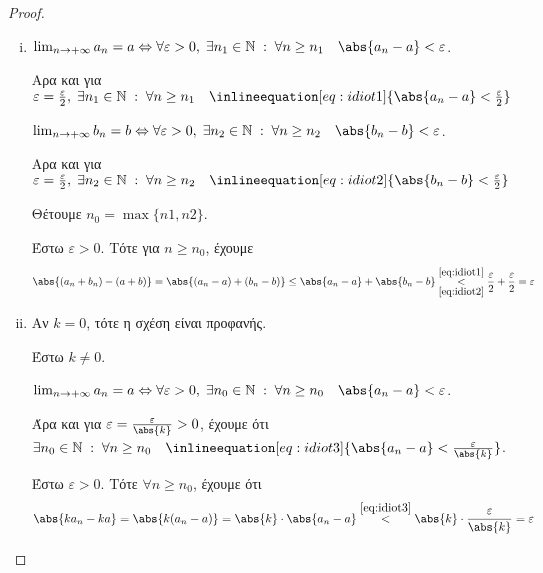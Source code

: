 \documentclass[main.tex]{subfiles}
\begin{document}
\begin{proof}
\item {}
    \begin{enumerate}[i)]
        \item $ \lim_{n \to +\infty} a_{n} = a \Leftrightarrow \forall \varepsilon > 0, \; 
            \exists n_{1} \in \mathbb{N} \; : \; \forall n \geq n_{1} \quad \abs{a_{n}-a} <
            \varepsilon$.

            Αρα και για $ \varepsilon = \frac{\varepsilon}{ 2}, \; \exists n_{1} \in \mathbb{N} 
            \; : \; \forall n \geq n_{1} \quad \inlineequation[eq:idiot1]{\abs{a_{n}-a} <
            \frac{\varepsilon}{ 2}} $

            $ \lim_{n \to +\infty} b_{n} = b \Leftrightarrow \forall \varepsilon > 0, \; 
            \exists n_{2} \in \mathbb{N} \; : \; \forall n \geq n_{2} \quad \abs{b_{n}-b} <
            \varepsilon$.

            Αρα και για $ \varepsilon = \frac{\varepsilon}{ 2}, \; \exists n_{2} \in \mathbb{N} 
            \; : \; \forall n \geq n_{2} \quad \inlineequation[eq:idiot2]{\abs{b_{n}-b} <
            \frac{\varepsilon}{ 2}} $

            Θέτουμε $ n_{0}= \max \{ n1,n2 \} $.

            Έστω $ \varepsilon >0 $. Τότε για $ n \geq n_{0} $, έχουμε 
            \[
                \abs{(a_{n}+ b_{n}) - (a+b)} = \abs{(a_{n}- a) + (b_{n}-b)} \leq \abs{a_{n}- a} + 
                \abs{b_{n}-b} \overset{\eqref{eq:idiot1}}{\underset{\eqref{eq:idiot2}}{<}} 
                \frac{\varepsilon }{2} + \frac{\varepsilon}{ 2} = \varepsilon
             \] 

         \item 
            Αν $ k=0 $, τότε η σχέση είναι προφανής.

            Έστω $ k \neq 0 $. 

            $ \lim_{n \to +\infty} a_{n} = a \Leftrightarrow \forall \varepsilon >0, \; \exists 
            n_{0} \in \mathbb{N} \; : \; \forall n \geq n_{0} \quad \abs{a_{n}- a} < \varepsilon$. 

            Άρα και για $ \varepsilon = \frac{\varepsilon}{\abs{k}} >0 $, έχουμε ότι $ \exists 
            n_{0} \in \mathbb{N} \; : \; \forall n \geq n_{0} \quad \inlineequation[eq:idiot3]
            {\abs{a_{n}- a} < \frac{\varepsilon}{\abs{k}}}$. 

            Έστω $ \varepsilon >0 $. Τότε $ \forall n \geq n_{0} $, έχουμε ότι 
            \[
                \abs{k a_{n}- ka} = \abs{k(a_{n}- a)} = \abs{k} \cdot \abs{a_{n}- a}
                \overset{\eqref{eq:idiot3}}{<} \abs{k}
                \cdot \frac{\varepsilon}{\abs{k}} = \varepsilon 
             \] 


\end{enumerate}
\end{proof}
\end{document}
